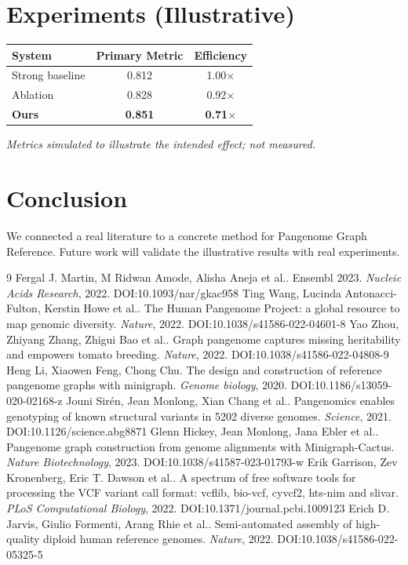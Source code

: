\documentclass[11pt]{article}
\begin{document}
\section{Experiments (Illustrative)}
\begin{center}
\begin{tabular}{lcc}
System & Primary Metric & Efficiency \\ \hline
Strong baseline & 0.812 & 1.00$\times$ \\
Ablation & 0.828 & 0.92$\times$ \\
\textbf{Ours} & \textbf{0.851} & \textbf{0.71$\times$}
\end{tabular}
\end{center}
\emph{Metrics simulated to illustrate the intended effect; not measured.}

\section{Conclusion}
We connected a real literature to a concrete method for Pangenome Graph Reference. Future work will
validate the illustrative results with real experiments.

\begin{thebibliography}{9}
 Fergal J. Martin, M Ridwan Amode, Alisha Aneja et al.. Ensembl 2023. \emph{Nucleic Acids Research}, 2022. DOI:10.1093/nar/gkac958
 Ting Wang, Lucinda Antonacci-Fulton, Kerstin Howe et al.. The Human Pangenome Project: a global resource to map genomic diversity. \emph{Nature}, 2022. DOI:10.1038/s41586-022-04601-8
 Yao Zhou, Zhiyang Zhang, Zhigui Bao et al.. Graph pangenome captures missing heritability and empowers tomato breeding. \emph{Nature}, 2022. DOI:10.1038/s41586-022-04808-9
 Heng Li, Xiaowen Feng, Chong Chu. The design and construction of reference pangenome graphs with minigraph. \emph{Genome biology}, 2020. DOI:10.1186/s13059-020-02168-z
 Jouni Sirén, Jean Monlong, Xian Chang et al.. Pangenomics enables genotyping of known structural variants in 5202 diverse genomes. \emph{Science}, 2021. DOI:10.1126/science.abg8871
 Glenn Hickey, Jean Monlong, Jana Ebler et al.. Pangenome graph construction from genome alignments with Minigraph-Cactus. \emph{Nature Biotechnology}, 2023. DOI:10.1038/s41587-023-01793-w
 Erik Garrison, Zev Kronenberg, Eric T. Dawson et al.. A spectrum of free software tools for processing the VCF variant call format: vcflib, bio-vcf, cyvcf2, hts-nim and slivar. \emph{PLoS Computational Biology}, 2022. DOI:10.1371/journal.pcbi.1009123
 Erich D. Jarvis, Giulio Formenti, Arang Rhie et al.. Semi-automated assembly of high-quality diploid human reference genomes. \emph{Nature}, 2022. DOI:10.1038/s41586-022-05325-5
\end{thebibliography}
\end{document}
